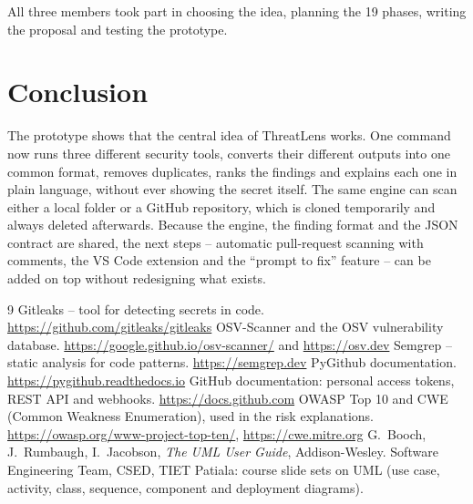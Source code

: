 \documentclass[12pt,a4paper]{article}
\begin{document}
All three members took part in choosing the idea, planning the 19 phases, writing the proposal and testing the prototype.

\section{Conclusion}

The prototype shows that the central idea of ThreatLens works. One command now runs three different security tools, converts their different outputs into one common format, removes duplicates, ranks the findings and explains each one in plain language, without ever showing the secret itself. The same engine can scan either a local folder or a GitHub repository, which is cloned temporarily and always deleted afterwards. Because the engine, the finding format and the JSON contract are shared, the next steps -- automatic pull-request scanning with comments, the VS Code extension and the ``prompt to fix'' feature -- can be added on top without redesigning what exists.

\begin{thebibliography}{9}
 Gitleaks -- tool for detecting secrets in code. \url{https://github.com/gitleaks/gitleaks}
 OSV-Scanner and the OSV vulnerability database. \url{https://google.github.io/osv-scanner/} and \url{https://osv.dev}
 Semgrep -- static analysis for code patterns. \url{https://semgrep.dev}
 PyGithub documentation. \url{https://pygithub.readthedocs.io}
 GitHub documentation: personal access tokens, REST API and webhooks. \url{https://docs.github.com}
 OWASP Top 10 and CWE (Common Weakness Enumeration), used in the risk explanations. \url{https://owasp.org/www-project-top-ten/}, \url{https://cwe.mitre.org}
 G.\ Booch, J.\ Rumbaugh, I.\ Jacobson, \emph{The UML User Guide}, Addison-Wesley.
 Software Engineering Team, CSED, TIET Patiala: course slide sets on UML (use case, activity, class, sequence, component and deployment diagrams).
\end{thebibliography}
\end{document}
